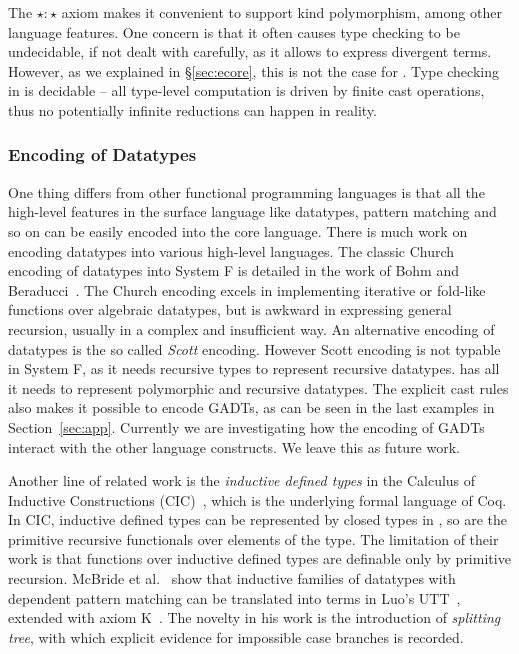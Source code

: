 The $\star : \star$ axiom makes it convenient to support kind
polymorphism, among other language features. One concern is that it
often causes type checking to be undecidable, if not dealt with
carefully, as it allows to express divergent terms. However, as we
explained in \S\ref{sec:ecore}, this is not the case for \name. Type
checking in \name is decidable -- all type-level computation is driven
by finite cast operations, thus no potentially infinite reductions can
happen in reality.

\subsubsection{Encoding of Datatypes}

One thing \name differs from other functional programming languages is
that all the high-level features in the surface language like
datatypes, pattern matching and so on can be easily encoded into the
core language. There is much work on encoding datatypes into various
high-level languages. The classic Church encoding of datatypes into
System F is detailed in the work of Bohm and
Beraducci~\cite{Bohm1985}. The Church encoding excels in implementing
iterative or fold-like functions over algebraic datatypes, but is
awkward in expressing general recursion, usually in a complex and
insufficient way. An alternative encoding of datatypes is the so
called \emph{Scott} encoding. However Scott encoding is not typable in
System F, as it needs recursive types to represent recursive
datatypes. \name has all it needs to represent polymorphic and
recursive datatypes. The explicit cast rules also makes it possible to
encode GADTs, as can be seen in the last examples in
Section~\ref{sec:app}. Currently we are investigating how the encoding
of GADTs interact with the other language constructs. We leave this as
future work.

Another line of related work is the \emph{inductive defined types} in
the Calculus of Inductive Constructions (CIC)~\cite{cic}, which is the
underlying formal language of Coq. In CIC, inductive defined types can
be represented by closed types in \coc, so are the primitive recursive
functionals over elements of the type. The limitation of their work is
that functions over inductive defined types are definable only by
primitive recursion. McBride et al.~\cite{elim:pi:pattern} show that
inductive families of datatypes with dependent pattern matching can be
translated into terms in Luo's UTT~\cite{Luo:UTT}, extended with axiom
K~\cite{axiomK}. The novelty in his work is the introduction of
\emph{splitting tree}, with which explicit evidence for impossible
case branches is recorded.

